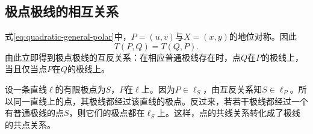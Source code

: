 %
%
%
%



\subsection{极点极线的相互关系}
\label{subsec:quadratic-reciprocity}

式\eqref{eq:quadratic-general-polar}中，\(P=(u,v)\)与\(X=(x,y)\)的地位对称。因此
\begin{equation}\label{eq:quadratic-polar-reciprocity}
 T(P,Q)=T(Q,P).
\end{equation}
由此立即得到极点极线的{\heiti{}互反关系}：在相应普通极线存在时，点\(Q\)在\(P\)的极线上，当且仅当点\(P\)在\(Q\)的极线上。

设一条直线\(\ell\)的有限极点为\(S\)，\(P\)在\(\ell\)上。因为\(P\in\ell_S\)，由互反关系知\(S\in\ell_P\)。所以同一直线上的点，其极线都经过该直线的极点。反过来，若若干极线都经过一个有普通极线的点\(S\)，则它们的极点都在\(\ell_S\)上。这样，点的共线关系转化成了极线的共点关系。

